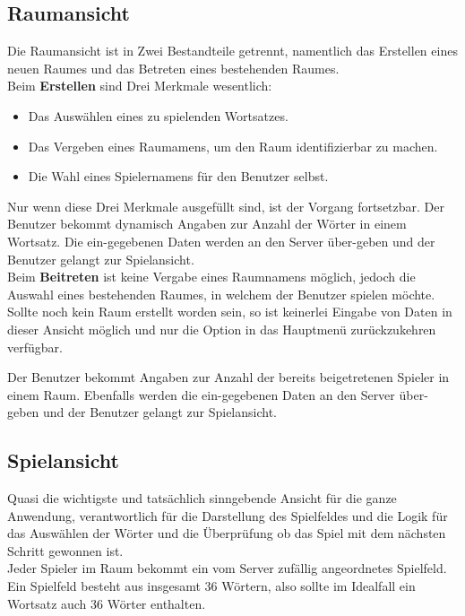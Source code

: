\documentclass[12pt]{scrartcl}
\begin{document}
	\subsection{Raumansicht}
	
		Die Raumansicht ist in Zwei Bestandteile getrennt, namentlich das Erstellen eines neuen Raumes und das Betreten eines bestehenden Raumes.\\
		
		Beim \textbf{Erstellen} sind Drei Merkmale wesentlich:
		
		\begin{itemize}
			\item Das Auswählen eines zu spielenden Wortsatzes.
			\item Das Vergeben eines Raumamens, um den Raum identifizierbar zu machen.
			\item Die Wahl eines Spielernamens für den Benutzer selbst.
		\end{itemize}
	
		Nur wenn diese Drei Merkmale ausgefüllt sind, ist der Vorgang fortsetzbar. Der Benutzer bekommt dynamisch Angaben zur Anzahl der Wörter in einem Wortsatz.
		Die ein-gegebenen Daten werden an den Server über-geben und der Benutzer gelangt zur Spielansicht.\\
		
		Beim \textbf{Beitreten} ist keine Vergabe eines Raumnamens möglich, jedoch die Auswahl eines bestehenden Raumes, in welchem der Benutzer spielen möchte. Sollte noch kein Raum erstellt worden sein, so ist keinerlei Eingabe von Daten in dieser Ansicht möglich und nur die Option in das Hauptmenü zurückzukehren verfügbar.
		
		Der Benutzer bekommt Angaben zur Anzahl der bereits beigetretenen Spieler in einem Raum.
		Ebenfalls werden die ein-gegebenen Daten an den Server über-geben und der Benutzer gelangt zur Spielansicht.
	
	\subsection{Spielansicht}
	
		Quasi die wichtigste und tatsächlich sinngebende Ansicht für die ganze Anwendung, verantwortlich für die Darstellung des Spielfeldes und die Logik für das Auswählen der Wörter und die Überprüfung ob das Spiel mit dem nächsten Schritt gewonnen ist.\\
		
		Jeder Spieler im Raum bekommt ein vom Server zufällig angeordnetes Spielfeld. Ein Spielfeld besteht aus insgesamt 36 Wörtern, also sollte im Idealfall ein Wortsatz auch 36 Wörter enthalten.
		
\end{document}
